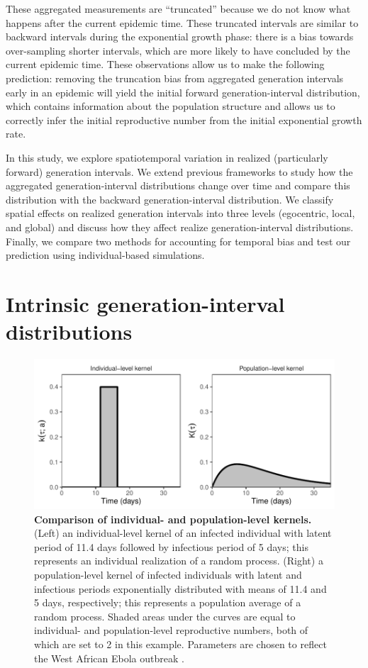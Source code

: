 \documentclass[12pt]{article}
\begin{document}
These aggregated measurements are ``truncated'' because we do not know what happens after the current epidemic time.
These truncated intervals are similar to backward intervals during the exponential growth phase: there is a bias towards over-sampling shorter intervals, which are more likely to have concluded by the current epidemic time.
These observations allow us to make the following prediction: removing the truncation bias from aggregated generation intervals early in an epidemic will yield the initial forward generation-interval distribution, which contains information about the population structure and allows us to correctly infer the initial reproductive number from the initial exponential growth rate.

In this study, we explore spatiotemporal variation in realized (particularly forward) generation intervals.
We extend previous frameworks to study how the aggregated generation-interval distributions change over time and compare this distribution with the backward generation-interval distribution.
We classify spatial effects on realized generation intervals into three levels (egocentric, local, and global) and discuss how they affect realize generation-interval distributions.
Finally, we compare two methods for accounting for temporal bias and test our prediction using individual-based simulations.

\section{Intrinsic generation-interval distributions}

\begin{figure}[!ht]
\includegraphics[width=\textwidth]{../fig/individual_and_population.pdf}
\caption{\textbf{Comparison of individual- and population-level kernels.}
(Left) an individual-level kernel of an infected individual with latent period of 11.4 days followed by infectious period of 5 days;
this represents an individual realization of a random process.
(Right) a population-level kernel of infected individuals with latent and infectious periods exponentially distributed with means of 11.4 and 5 days, respectively;
this represents a population average of a random process.
Shaded areas under the curves are equal to individual- and population-level reproductive numbers, both of which are set to 2 in this example.
Parameters are chosen to reflect the West African Ebola outbreak \citep{who2014ebola}.}
\label{fig:indpop}
\end{figure}
\end{document}
